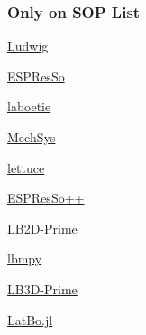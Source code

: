 \documentclass[t,12pt,numbers,fleqn]{beamer}
\begin{document}

\begin{frame}
\frametitle{Only on SOP List}

\begin{multicols}{2}	
  \bi
			\item \href{https://ludwig.epcc.ed.ac.uk/}{Ludwig}
			\item \href{http://espressomd.org/wordpress/}{ESPResSo}

			\item \href{https://github.com/maxlevesque/laboetie}{laboetie}
			\item \href{http://mechsys.nongnu.org/}{MechSys}
			\item \href{https://github.com/Olllom/lettuce}{lettuce}
			\item \href{https://github.com/espressopp/espressopp}{ESPResSo++} 

			\item \href{http://faculty.fiu.edu/~sukopm/LBnD_Prime/LBnD_Prime.html}{LB2D-Prime}	

			\item \href{https://pypi.org/project/lbmpy/}{lbmpy}	
			\item \href{http://faculty.fiu.edu/~sukopm/LBnD_Prime/LBnD_Prime.html}{LB3D-Prime}	
			\item \href{https://github.com/UCL/LatBo.jl}{LatBo.jl}
	\ei
\end{multicols}


\end{frame}



\end{document}
